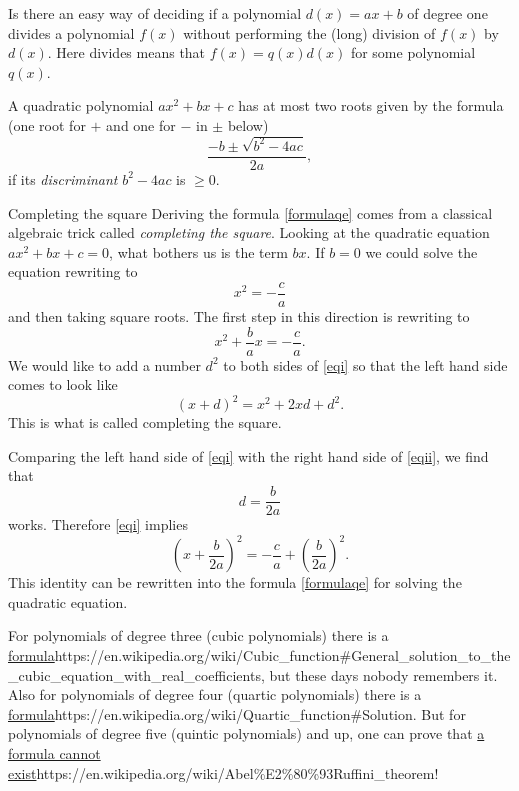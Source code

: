 \documentclass{article}
\begin{document}
\beginshex
Is there an easy way of deciding if a polynomial $d(x) = a x + b$ of degree one divides
a polynomial $f(x)$ without performing the (long) division of $f(x)$ by
$d(x)$. Here divides means that $f(x) = q(x) d(x)$ for some polynomial $q(x)$.
\endshex

A quadratic polynomial $a x^2 + b x + c$ has at most two roots given
by the formula (one root for $+$ and one for $-$ in $\pm$ below)
\begin{equation}\label{formulaqe}
\frac{-b\pm \sqrt{b^2 - 4 a c}}{2 a},
\end{equation}
if its \emph{discriminant} $b^2 - 4 a c$ is $\geq 0$.

\begin{hideinbutton}{Completing the square}
  Deriving the formula \eqref{formulaqe} comes from a classical algebraic trick called \emph{completing the square}. Looking
  at the quadratic equation $a x^2 + b x + c = 0$, what bothers us is the term $b x$. If $b=0$ we could solve the equation rewriting to
  $$
  x^2 = -\frac{c}{a}
  $$
  and then taking square roots. The first step in this direction is rewriting to
  \begin{equation}\label{eqi}
  x^2 + \frac{b}{a} x = -\frac{c}{a}.
  \end{equation}
  We would like to add a number $d^2$ to both sides of \eqref{eqi} so that the left hand side comes to look like
  \begin{equation}\label{eqii}
    (x + d)^2 = x^2 + 2 x d + d^2.
  \end{equation}
    This is what is called completing the square.

  Comparing the left hand side of \eqref{eqi} with the right hand side of \eqref{eqii}, we find that 
  $$
  d = \frac{b}{2 a}
  $$
  works.
  Therefore \eqref{eqi} implies
  $$
  \left( x + \frac{b}{2a}\right)^2 = -\frac{c}{a} + \left(\frac{b}{2 a}\right)^2.
  $$
  This identity can be rewritten into the formula \eqref{formulaqe} for solving the
  quadratic equation.
  \end{hideinbutton}


For polynomials of degree three (cubic
polynomials) there is a \url{formula}{https://en.wikipedia.org/wiki/Cubic_function#General_solution_to_the_cubic_equation_with_real_coefficients}, but these days nobody remembers it. Also for polynomials of
degree four (quartic polynomials) there is a \url{formula}{https://en.wikipedia.org/wiki/Quartic_function#Solution}. But for polynomials of degree five (quintic polynomials) and up, one can prove
that \url{a formula cannot exist}{https://en.wikipedia.org/wiki/Abel\%E2\%80\%93Ruffini_theorem}!
\end{document}
